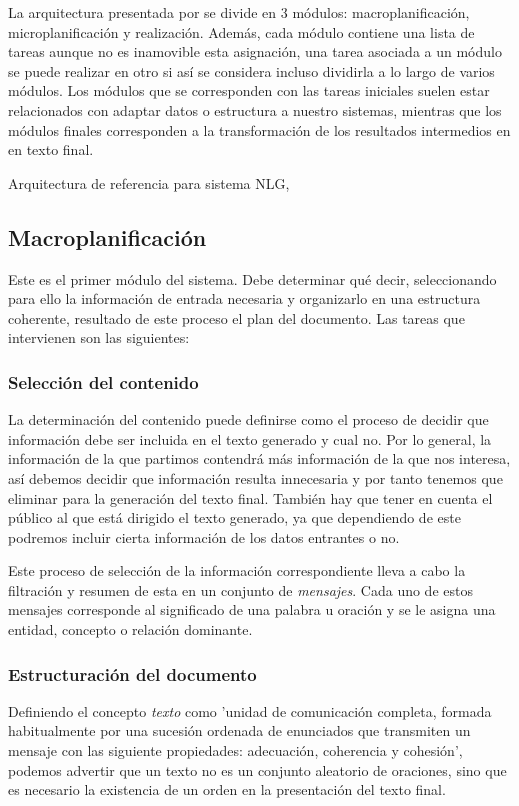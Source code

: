 La arquitectura presentada por \cite{gatt2018survey} se divide en 3 módulos: macroplanificación, microplanificación y realización. Además, cada módulo contiene una lista de tareas aunque no es inamovible esta asignación, una tarea asociada a un módulo se puede realizar en otro si así se considera incluso dividirla a lo largo de varios módulos. Los módulos que se corresponden con las tareas iniciales suelen estar relacionados con adaptar datos o estructura a nuestro sistemas, mientras que los módulos finales corresponden a la transformación de los resultados intermedios en en texto final.

%
{Arquitectura de referencia para sistema NLG, \citet{vicente2015generacion}}

\subsection{Macroplanificación}
Este es el primer módulo del sistema. Debe determinar qué decir, seleccionando para ello la información de entrada necesaria y organizarlo en una estructura coherente, resultado de este proceso el plan del documento. Las tareas que
intervienen son las siguientes: 

\subsubsection{Selección del contenido}
La determinación del contenido puede definirse como el proceso de decidir que información debe ser incluida en el texto generado y cual no. Por lo general, la información de la que partimos contendrá más información de la que nos interesa, así debemos decidir que información resulta innecesaria y por tanto tenemos que eliminar para la generación del texto final. También hay que tener en cuenta el público al que está dirigido el texto generado, ya que dependiendo de este podremos incluir cierta información de los datos entrantes o no.

Este proceso de selección de la información correspondiente lleva a cabo la filtración y resumen de esta en un conjunto de \textit{mensajes}. Cada uno de estos mensajes corresponde al significado de una palabra u oración y se le asigna una entidad, concepto o relación dominante.

\subsubsection{Estructuración del documento}
Definiendo el concepto \textit{texto} como 'unidad de comunicación completa, formada habitualmente por una sucesión ordenada de enunciados que transmiten un mensaje con las siguiente propiedades: adecuación, coherencia y cohesión', podemos advertir que un texto no es un conjunto aleatorio de oraciones, sino que es necesario la existencia de un orden en la presentación del texto final.

